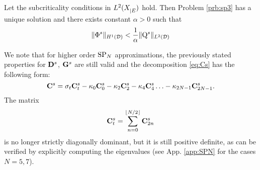 \begin{theorem}
	Let the subcriticality conditions in $\Lp[2](\XE)$ hold. Then Problem \ref{prb:sp3} has a unique solution and there
	exists constant $\alpha > 0$ such that
	$$
		\norm[{\Hp[1](\VV)}]{\Phi^s} < \frac{1}{\alpha} \norm[{\Lp[2](\VV)}]{\mathrm{Q}^s}
	$$
\end{theorem}

We note that for higher order $\SPN$ approximations, the previously stated properties for $\mat{D}^s$, $\mat{G}^s$ are
still valid and the decomposition \eqref{eq:Cs} has the following form:
$$
	\mat{C}^s = \sigma_t\mat{C}^s_t - \kappa_0 \mat{C}^s_0 - \kappa_2 \mat{C}^s_2 - \kappa_4 \mat{C}^s_4 \ldots -
	\kappa_{2N-1} \mat{C}^s_{2N-1}.
$$
The matrix 
$$
	\mat{C}^s_t = \sum_{n=0}^{\floor{N/2}} \mat{C}^s_{2n}
$$
is no longer strictly diagonally dominant, but it is still positive definite, as can be verified
by explicitly computing the eigenvalues (see App. \ref{app:SPN} for the cases $N = 5,7$).

